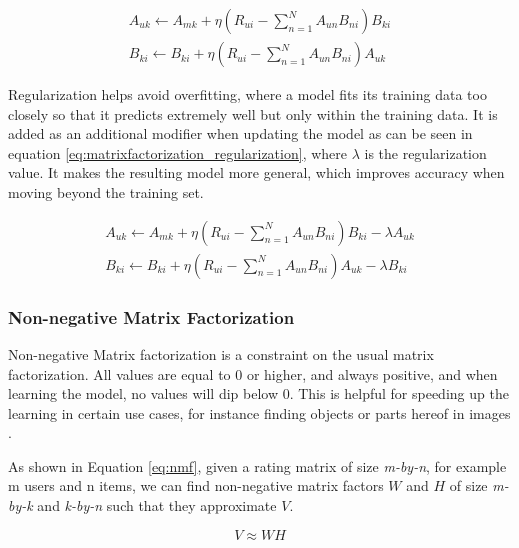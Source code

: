 \begin{equation}\label{eq:matrixfactorization_learningrate}
	\begin{split}
	A_{uk}\leftarrow A_{mk} + \eta(R_{ui}-\sum_{n=1}^{N}A_{un}B_{ni})B_{ki}
	\\
	B_{ki}\leftarrow B_{ki} + \eta(R_{ui}-\sum_{n=1}^{N}A_{un}B_{ni})A_{uk}
	\end{split}
\end{equation}

Regularization helps avoid overfitting, where a model fits its training data too closely so that it predicts extremely well but only within the training data. It is added as an additional modifier when updating the model as can be seen in equation \ref{eq:matrixfactorization_regularization}, where $\lambda$ is the regularization value. It makes the resulting model more general, which improves accuracy when moving beyond the training set.

\begin{equation}\label{eq:matrixfactorization_regularization}
	\begin{split}
	A_{uk}\leftarrow A_{mk} + \eta(R_{ui}-\sum_{n=1}^{N}A_{un}B_{ni})B_{ki}-\lambda A_{uk}
	\\
	B_{ki}\leftarrow B_{ki} + \eta(R_{ui}-\sum_{n=1}^{N}A_{un}B_{ni})A_{uk} -\lambda B_{ki}
	\end{split}
\end{equation}

\subsubsection{Non-negative Matrix Factorization}

Non-negative Matrix factorization is a constraint on the usual matrix factorization. All values are equal to 0 or higher, and always positive, and when learning the model, no values will dip below 0. This is helpful for speeding up the learning in certain use cases, for instance finding objects or parts hereof in images \cite{nnmf}.

As shown in Equation \ref{eq:nmf}, given a rating matrix of size \textit{m-by-n}, for example m users and n items, we can find non-negative matrix factors $W$ and $H$ of size \textit{m-by-k} and \textit{k-by-n} such that they approximate $V$.

\begin{equation} \label{eq:nmf}
	V \approx W H
\end{equation}

